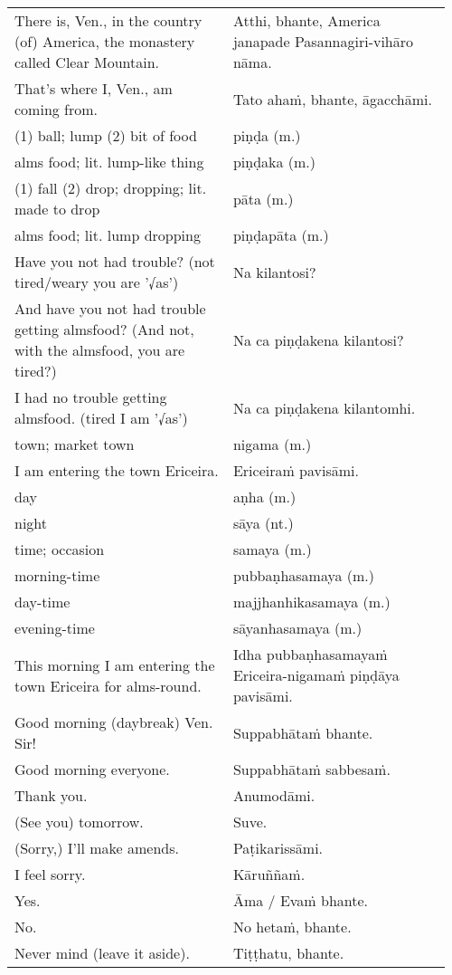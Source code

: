 \documentclass[a5paper]{memoir}
\begin{document}
\begin{longtable}{L{0.48\linewidth} L{0.48\linewidth}}
There is, Ven., in the country (of) America, the monastery called Clear Mountain. & Atthi, bhante, America janapade Pasannagiri-vihāro nāma.\\[0pt]
That's where I, Ven., am coming from. & Tato ahaṁ, bhante, āgacchāmi.\\[0pt]
(1) ball; lump (2) bit of food & piṇḍa (m.)\\[0pt]
alms food; lit. lump-like thing & piṇḍaka (m.)\\[0pt]
(1) fall (2) drop; dropping; lit. made to drop & pāta (m.)\\[0pt]
alms food; lit. lump dropping & piṇḍapāta (m.)\\[0pt]
Have you not had trouble? (not tired/weary you are '√as') & Na kilantosi?\\[0pt]
And have you not had trouble getting almsfood? (And not, with the almsfood, you are tired?) & Na ca piṇḍakena kilantosi?\\[0pt]
I had no trouble getting almsfood. (tired I am '√as') & Na ca piṇḍakena kilantomhi.\\[0pt]
town; market town & nigama (m.)\\[0pt]
I am entering the town Ericeira. & Ericeiraṁ pavisāmi.\\[0pt]
day & aṇha (m.)\\[0pt]
night & sāya (nt.)\\[0pt]
time; occasion & samaya (m.)\\[0pt]
morning-time & pubbaṇhasamaya (m.)\\[0pt]
day-time & majjhanhikasamaya (m.)\\[0pt]
evening-time & sāyanhasamaya (m.)\\[0pt]
This morning I am entering the town Ericeira for alms-round. & Idha pubbaṇhasamayaṁ Ericeira-nigamaṁ piṇḍāya pavisāmi.\\[0pt]
Good morning (daybreak) Ven. Sir! & Suppabhātaṁ bhante.\\[0pt]
Good morning everyone. & Suppabhātaṁ sabbesaṁ.\\[0pt]
Thank you. & Anumodāmi.\\[0pt]
(See you) tomorrow. & Suve.\\[0pt]
(Sorry,) I'll make amends. & Paṭikarissāmi.\\[0pt]
I feel sorry. & Kāruññaṁ.\\[0pt]
Yes. & Āma / Evaṁ bhante.\\[0pt]
No. & No hetaṁ, bhante.\\[0pt]
Never mind (leave it aside). & Tiṭṭhatu, bhante.\\[0pt]

\end{longtable}
\end{document}
